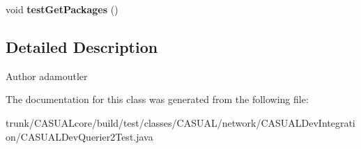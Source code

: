 \begin{DoxyCompactItemize}
\item 
\hypertarget{class_c_a_s_u_a_l_1_1network_1_1_c_a_s_u_a_l_dev_integration_1_1_c_a_s_u_a_l_dev_querier2_test_a146b1387c23c7b6181754ae0c06521ff}{void {\bfseries test\-Get\-Packages} ()}\label{class_c_a_s_u_a_l_1_1network_1_1_c_a_s_u_a_l_dev_integration_1_1_c_a_s_u_a_l_dev_querier2_test_a146b1387c23c7b6181754ae0c06521ff}

\end{DoxyCompactItemize}


\subsection{Detailed Description}
\begin{DoxyAuthor}{Author}
adamoutler 
\end{DoxyAuthor}


The documentation for this class was generated from the following file\-:\begin{DoxyCompactItemize}
\item 
trunk/\-C\-A\-S\-U\-A\-Lcore/build/test/classes/\-C\-A\-S\-U\-A\-L/network/\-C\-A\-S\-U\-A\-L\-Dev\-Integration/C\-A\-S\-U\-A\-L\-Dev\-Querier2\-Test.\-java\end{DoxyCompactItemize}
